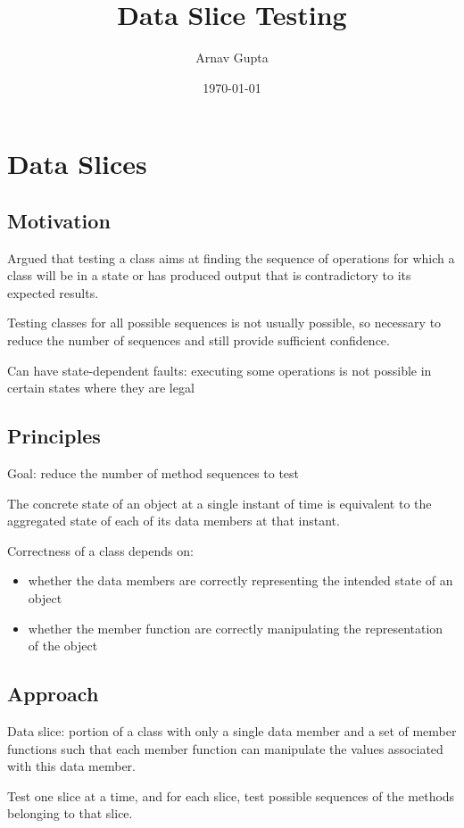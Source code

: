 \documentclass[11pt]{article}
\author{Arnav Gupta}
\date{\today}
\title{Data Slice Testing}
\begin{document}
\maketitle
\tableofcontents

\section{Data Slices}
\label{sec:orgd21991d}
\subsection{Motivation}
\label{sec:orgffdb37e}
Argued that testing a class aims at finding the sequence of operations
for which a class will be in a state or has produced output that is
contradictory to its expected results.

Testing classes for all possible sequences is not usually possible,
so necessary to reduce the number of sequences and still provide
sufficient confidence.

Can have state-dependent faults: executing some operations is not
possible in certain states where they are legal
\subsection{Principles}
\label{sec:org13426cd}
Goal: reduce the number of method sequences to test

The concrete state of an object at a single instant of time is
equivalent to the aggregated state of each of its data members at that
instant.

Correctness of a class depends on:
\begin{itemize}
\item whether the data members are correctly representing the intended
state of an object
\item whether the member function are correctly manipulating the
representation of the object
\end{itemize}
\subsection{Approach}
\label{sec:org2618d27}
Data slice: portion of a class with only a single data member and
a set of member functions such that each member function can
manipulate the values associated with this data member.

Test one slice at a time, and for each slice, test possible sequences
of the methods belonging to that slice.
\end{document}
